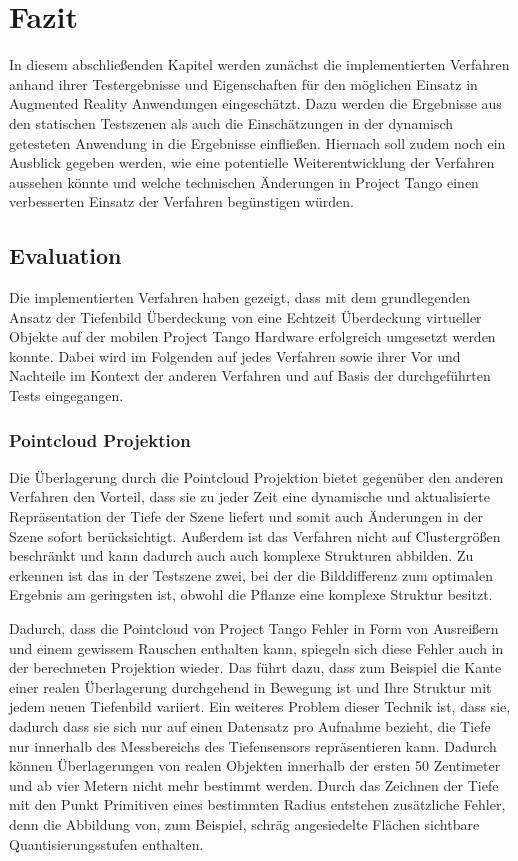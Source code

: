\chapter{Fazit} \label{sec:conclusion}

In diesem abschließenden Kapitel werden zunächst die implementierten Verfahren anhand ihrer Testergebnisse und Eigenschaften für den möglichen Einsatz in Augmented Reality Anwendungen eingeschätzt. Dazu werden die Ergebnisse aus den statischen Testszenen als auch die Einschätzungen in der dynamisch getesteten Anwendung in die Ergebnisse einfließen. Hiernach soll zudem noch ein Ausblick gegeben werden, wie eine potentielle Weiterentwicklung der Verfahren aussehen könnte und welche technischen Änderungen in Project Tango einen verbesserten Einsatz der Verfahren begünstigen würden.

\section{Evaluation}

Die implementierten Verfahren haben gezeigt, dass mit dem grundlegenden Ansatz der Tiefenbild Überdeckung von \citet{wloka1995resolving} eine Echtzeit Überdeckung virtueller Objekte auf der mobilen Project Tango Hardware erfolgreich umgesetzt werden konnte. Dabei wird im Folgenden auf jedes Verfahren sowie ihrer Vor und Nachteile im Kontext der anderen Verfahren und auf Basis der durchgeführten Tests eingegangen. 

\subsection*{Pointcloud Projektion}

Die Überlagerung durch die Pointcloud Projektion bietet gegenüber den anderen Verfahren den Vorteil, dass sie zu jeder Zeit eine dynamische und aktualisierte Repräsentation der Tiefe der Szene liefert und somit auch Änderungen in der Szene sofort berücksichtigt. Außerdem ist das Verfahren nicht auf Clustergrößen beschränkt und kann dadurch auch auch komplexe Strukturen abbilden. Zu erkennen ist das in der Testszene zwei, bei der die Bilddifferenz zum optimalen Ergebnis am geringsten ist, obwohl die Pflanze eine komplexe Struktur besitzt.

Dadurch, dass die Pointcloud von Project Tango Fehler in Form von Ausreißern und einem gewissem Rauschen enthalten kann, spiegeln sich diese Fehler auch in der berechneten Projektion wieder. Das führt dazu, dass zum Beispiel die Kante einer realen Überlagerung durchgehend in Bewegung ist und Ihre Struktur mit jedem neuen Tiefenbild variiert. Ein weiteres Problem dieser Technik ist, dass sie, dadurch dass sie sich nur auf einen Datensatz pro Aufnahme bezieht, die Tiefe nur innerhalb des Messbereichs des Tiefensensors repräsentieren kann. Dadurch können Überlagerungen von realen Objekten innerhalb der ersten 50 Zentimeter und ab vier Metern nicht mehr bestimmt werden. Durch das Zeichnen der Tiefe mit den Punkt Primitiven eines bestimmten Radius entstehen zusätzliche Fehler, denn die Abbildung von, zum Beispiel, schräg angesiedelte Flächen sichtbare Quantisierungsstufen enthalten.

